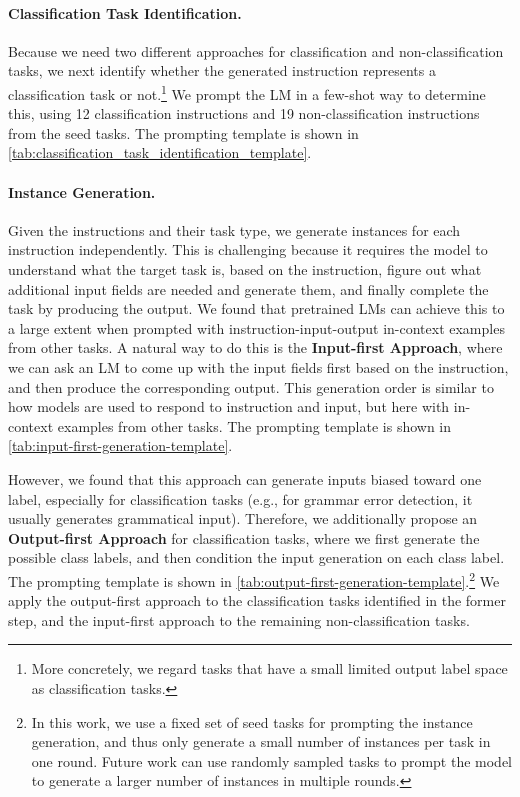 \documentclass[11pt]{article}
\begin{document}
\paragraph{Classification Task Identification.}
Because we need two different approaches for classification and non-classification tasks, we next identify whether the generated instruction represents a classification task or not.\footnote{More concretely, we regard tasks that have a small limited output label space as classification tasks.} 
We prompt the LM in a few-shot way to determine this, using 12 classification instructions and 19 non-classification instructions from the seed tasks. The prompting template is shown in \autoref{tab:classification_task_identification_template}. 

\paragraph{Instance Generation.}
Given the instructions and their task type, we generate instances for each instruction independently. This is challenging because it requires the model to understand what the target task is, based on the instruction, figure out what additional input fields are needed and generate them, and finally complete the task by producing the output. We found that pretrained LMs can achieve this to a large extent when prompted with instruction-input-output in-context examples from other tasks.
A natural way to do this is the \textbf{Input-first Approach}, where we can ask an LM to come up with the input fields first based on the instruction, and then produce the corresponding output. This generation order is similar to how models are used to respond to instruction and input, but here with in-context examples from other tasks. The prompting template is shown in \autoref{tab:input-first-generation-template}. 

However, we found that this approach can generate inputs biased toward one label, especially for classification tasks (e.g., for grammar error detection, it usually generates grammatical input). Therefore, we additionally propose an
\textbf{Output-first Approach} for classification tasks, where we first generate the possible class labels, and then condition the input generation on each class label. The prompting template is shown in \autoref{tab:output-first-generation-template}.\footnote{In this work, we use a fixed set of seed tasks for prompting the instance generation, and thus only generate a small number of instances per task in one round. Future work can use randomly sampled tasks to prompt the model to generate a larger number of instances in multiple rounds.} We apply the output-first approach to the classification tasks identified in the former step, and the input-first approach to the remaining non-classification tasks.
\end{document}
